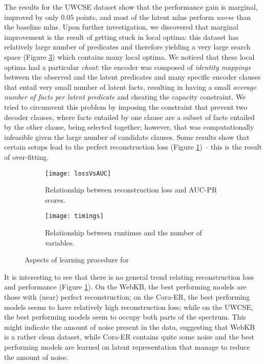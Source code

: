 The results for the UWCSE dataset show that the performance gain is marginal, improved by only $0.05$ points, and most of the latent \gls{mln}s perform \textit{worse} than the baseline \gls{mln}s.
Upon further investigation, we discovered that marginal improvement is the result of  getting stuck in local optima: this dataset has relatively large number of predicates  and therefore yielding a very large search space (Figure \ref{fig:timings}) which contains many local optima.
We noticed that these local optima had a particular \textit{cheat}: the encoder was composed of \textit{identity mappings} between the observed and the latent predicates and many specific encoder clauses that entail very small number of latent facts, resulting in having a small \textit{average number of facts per latent predicate} and cheating the capacity constraint.
We tried to circumvent this problem by imposing the constraint that prevent two decoder clauses, where facts entailed by one clause are a subset of facts entailed by the other clause, being selected together; however, that was computationally infeasible given the large number of candidate clauses.
Some results show that certain setups lead to the perfect reconstruction loss (Figure \ref{fig:lossvsaucpr}) -- this is the result of over-fitting.




\begin{figure}[t!]
	\centering
	\begin{subfigure}[t]{0.48\linewidth}
		\centering
		\texttt{[image: lossVsAUC]}
		\caption{Relationship between reconstruction loss and AUC-PR scores. \label{fig:lossvsaucpr}}
	\end{subfigure}
	\hspace{.2em}
	\begin{subfigure}[t]{0.48\linewidth}
		\centering
		\texttt{[image: timings]}

		\caption{Relationship between runtimes and the number of variables.\label{fig:timings}}
	\end{subfigure}
	\caption{Aspects of learning procedure for }
\end{figure}



It is interesting to see that there is no general trend relating reconstruction loss and performance (Figure \ref{fig:lossvsaucpr}).
On the WebKB, the best performing models are those with (near) perfect reconstruction; on the Cora-ER, the best performing models seems to have relatively high reconstruction loss; while on the UWCSE, the best performing models seem to occupy both parts of the spectrum.
This might indicate the amount of noise present in the data, suggesting that WebKB is a rather clean dataset, while Cora-ER contains quite some noise and the best performing models are learned on latent representation that manage to reduce the amount of noise.


